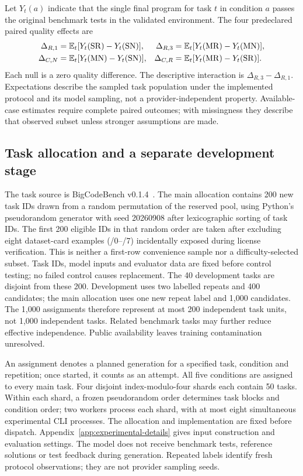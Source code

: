 Let $Y_t(a)$ indicate that the single final program for task $t$ in condition $a$ passes the original benchmark tests in the validated environment. The four predeclared paired quality effects are
\begin{align}
\Delta_{R,1}&=\mathbb{E}_t[Y_t(\mathrm{SR})-Y_t(\mathrm{SN})], &
\Delta_{R,3}&=\mathbb{E}_t[Y_t(\mathrm{MR})-Y_t(\mathrm{MN})],\\
\Delta_{C,N}&=\mathbb{E}_t[Y_t(\mathrm{MN})-Y_t(\mathrm{SN})], &
\Delta_{C,R}&=\mathbb{E}_t[Y_t(\mathrm{MR})-Y_t(\mathrm{SR})].
\end{align}
Each null is a zero quality difference. The descriptive interaction is $\Delta_{R,3}-\Delta_{R,1}$. Expectations describe the sampled task population under the implemented protocol and its model sampling, not a provider-independent property. Available-case estimates require complete paired outcomes; with missingness they describe that observed subset unless stronger assumptions are made.

\subsection{Task allocation and a separate development stage}
The task source is BigCodeBench v0.1.4~\cite{zhuo2024bigcodebench}. The main allocation contains 200 new task IDs drawn from a random permutation of the reserved pool, using Python's pseudorandom generator with seed 20260908 after lexicographic sorting of task IDs. The first 200 eligible IDs in that random order are taken after excluding eight dataset-card examples (/0--/7) incidentally exposed during license verification. This is neither a first-row convenience sample nor a difficulty-selected subset. Task IDs, model inputs and evaluator data are fixed before control testing; no failed control causes replacement. The 40 development tasks are disjoint from these 200. Development uses two labelled repeats and 400 candidates; the main allocation uses one new repeat label and 1,000 candidates. The 1,000 assignments therefore represent at most 200 independent task units, not 1,000 independent tasks. Related benchmark tasks may further reduce effective independence. Public availability leaves training contamination unresolved.

An assignment denotes a planned generation for a specified task, condition and repetition; once started, it counts as an attempt. All five conditions are assigned to every main task. Four disjoint index-modulo-four shards each contain 50 tasks. Within each shard, a frozen pseudorandom order determines task blocks and condition order; two workers process each shard, with at most eight simultaneous experimental CLI processes. The allocation and implementation are fixed before dispatch. Appendix~\ref{app:experimental-details} gives input construction and evaluation settings. The model does not receive benchmark tests, reference solutions or test feedback during generation. Repeated labels identify fresh protocol observations; they are not provider sampling seeds.

